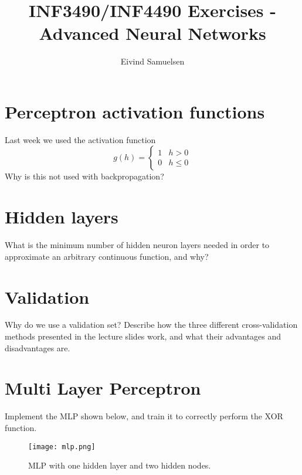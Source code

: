 
\title{\vspace{-2cm}INF3490/INF4490 Exercises - Advanced Neural Networks}
\author{Eivind Samuelsen}
\date{}

\setlength\parindent{0pt}


    \renewcommand\marginsymbol[1][0pt]{%
  \tabto*{0cm}\makebox[-1cm][c]{$\mathbb{P}$}\tabto*{\TabPrevPos}}

\maketitle


\section{Perceptron activation functions}
Last week we used the activation function
\[
g(h) =
\begin{cases}
      1 & h > 0 \\
      0 & h \leq 0
   \end{cases}
\]
Why is this not used with backpropagation?

\section{Hidden layers}
What is the minimum number of hidden neuron layers needed in order to approximate an arbitrary continuous function, and why?

\section{Validation}
Why do we use a validation set?
Describe how the three different cross-validation methods presented in the lecture slides work, and what their advantages and disadvantages are.

\section{Multi Layer Perceptron \marginsymbol}
Implement the MLP shown below, and train it to correctly perform the XOR function.

\begin{figure}[H]
\begin{center}
\texttt{[image: mlp.png]}
\caption{MLP with one hidden layer and two hidden nodes.}
\label{fig:mlp}
\end{center}
\end{figure}

